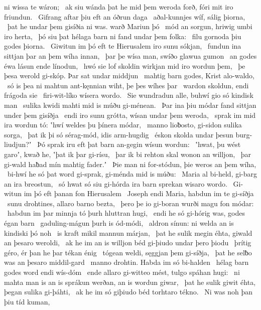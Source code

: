 ni wissa te wáron; \hld\ ak siu wánda þat he mid þem weroda forð,
fóri mit iro friundun. \hld\ Gifrang aftar þiu
eft an óðrun daga \hld\ aðal-kunnjes wíf,
sálig þiorna, \hld\ þat he undar þem gisíðia ni was.
warð Mariun þó \hld\ mód an sorgun,
hriwig umbi iro herta, \hld\ þó siu þat hélaga barn
ni fand undar þem folka: \hld\ filu gornoda
þiu godes þiorna. \hld\ Giwitun im þó eft te Hierusalem
iro sunu sókjan, \hld\ fundun ina sittjan þar
an þem wíha innan, \hld\ þar þe wísa man,
swíðo glawua gumon \hld\ an godes éwa
lásun ende línodun, \hld\ hwó sie lof skoldin
wirkjan mid iro wordun þem, \hld\ þe þesa werold gi-skóp.
Þar sat undar middjun \hld\ mahtig barn godes,
Krist alo-waldo, \hld\ só is þea ni mahtun ant-kęnnian wiht,
þe þes wíhes þar \hld\ wardon skoldun,
endi frágoda sie \hld\ firi-wit-líko
wísera wordo. \hld\ Sie wundradun alle,
buhwí gio só kindisk man \hld\ sulika kwidi mahti
mid is múðu gi-ménean. \hld\ Þar ina þiu módar fand
sittjan under þem gisíðja \hld\ endi iro sunu grótta,
wísan undar þem weroda, \hld\ sprak im mid ira wordun tó:
ʽhwí weldes þu þínera módar, \hld\ manno lioƀosto,
gi-sidon sulika sorga, \hld\ þat ik þi só sérag-mód,
idis arm-hugdig \hld\ éskon skolda
undar þesun burg-liudjun?ʼ \hld\ Þó sprak iru eft þat barn an-gegin
wísun wordun: \hld\ ʽhwat, þu wést garoʼ, kwað he,
ʽþat ik þar gi-rísu, \hld\ þar ik bi rehton skal
wonon an willjon, \hld\ þar gi-wald haƀad
mín mahtig fader.ʼ \hld\ Þie man ni for-stódun,
þie weros an þem wíha, \hld\ bi-hwí he só þat word gi-sprak,
gi-ménda mid is múðu: \hld\ Maria al bi-held,
gi-barg an ira breostun, \hld\ só hwat só siu gi-hórda ira barn sprekan
wisaro wordo. \hld\ Gi-witun im þó eft þanan
fon Hierusalem \hld\ Joseph endi Maria,
habdun im te gi-síðja \hld\ sunu drohtines,
allaro barno bezta, \hld\ þero þe io gi-boran wurði
magu fon módar: \hld\ habdun im þar minnja tó
þurh hluttran hugi, \hld\ endi he só gi-hórig was,
godes égan barn \hld\ gaduling-mágun
þurh is ód-módi, \hld\ aldron sínun:
ni welda an is kindiski þó noh \hld\ is kraft mikil
mannun márjan, \hld\ þat he sulik megin éhta,
giwald an þesaro weroldi, \hld\ ak he im an is willjon béd
gi-þiudo undar þero þiodu \hld\ þrítig géro,
ér þan he þar tékan énig \hld\ tógean weldi,
sęggjan þem gi-síðja, \hld\ þat he selƀo was
an þesaro middil-gard \hld\ manno drohtin.
Habda im só bi-halden \hld\ hélag barn godes
word endi wís-dóm \hld\ ende allaro gi-witteo mést,
tulgo spáhan hugi: \hld\ ni mahta man is an is sprákun werðan,
an is wordun giwar, \hld\ þat he sulik giwit éhta,
þegan sulika gi-þáhti, \hld\ ak he im só giþiudo béd
torhtaro tékno. \hld\ Ni was noh þan þiu tíd kuman,
